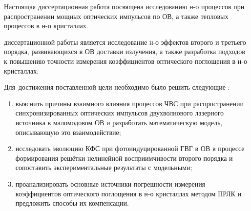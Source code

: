 Настоящая диссертационная работа посвящена исследованию н-о процессов при распространении мощных оптических импульсов по ОВ, а также тепловых процессов в н-о кристаллах.

\ifsynopsis
\else
\fi


{\aim} диссертационной работы является исследование н-о эффектов второго и третьего порядка, развивающихся в ОВ доставки излучения, а также разработка подходов к повышению точности измерения коэффициентов оптического поглощения в н-о кристаллах.

Для~достижения поставленной цели необходимо было решить следующие {\tasks}:
\begin{enumerate}[beginpenalty=10000] %
  \item выяснить причины взаимного влияния процессов ЧВС при распространении синхронизированных оптических импульсов двухволнового лазерного источника в маломодовом ОВ и разработать математическую модель, описывающую это взаимодействие;
  
  \item исследовать эволюцию КФС при фотоиндуцированной ГВГ в ОВ в процессе формирования решётки нелинейной восприимчивости второго порядка и сопоставить экспериментальные результаты с модельными;

  \item проанализировать основные источники погрешности измерения коэффициентов оптического поглощения в н-о кристаллах методом ПРЛК и предложить способы их компенсации.
\end{enumerate}



